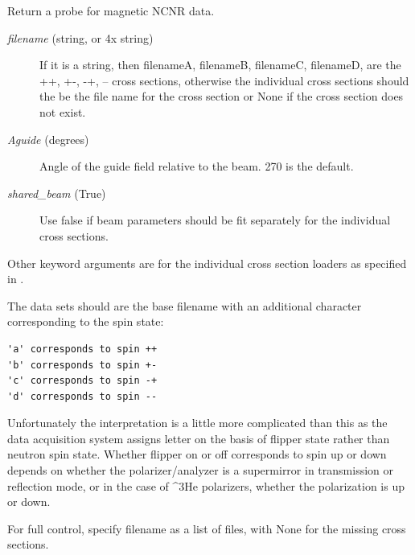 \documentclass[letterpaper,10pt,english]{sphinxmanual}
\begin{document}
\begin{fulllineitems}
\label{api/ncnrdata:refl1d.ncnrdata.load_magnetic}
Return a probe for magnetic NCNR data.
\begin{description}
\item[{\emph{filename} (string, or 4x string)}] \leavevmode
If it is a string, then filenameA, filenameB, filenameC, filenameD,
are the ++, +-, -+, -- cross sections, otherwise the individual
cross sections should the be the file name for the cross section or
None if the cross section does not exist.

\item[{\emph{Aguide} (degrees)}] \leavevmode
Angle of the guide field relative to the beam.  270 is the default.

\item[{\emph{shared\_beam} (True)}] \leavevmode
Use false if beam parameters should be fit separately for the
individual cross sections.

\end{description}

Other keyword arguments are for the individual cross section loaders
as specified in {\hyperref[api/instrument:refl1d.instrument.Monochromatic]{}}.

The data sets should are the base filename with an additional character
corresponding to the spin state:

\begin{Verbatim}[commandchars=@\[\]]
'a' corresponds to spin ++
'b' corresponds to spin +-
'c' corresponds to spin -+
'd' corresponds to spin --
\end{Verbatim}

Unfortunately the interpretation is a little more complicated than
this as the data acquisition system assigns letter on the basis of
flipper state rather than neutron spin state.  Whether flipper on
or off corresponds to spin up or down depends on whether the
polarizer/analyzer is a supermirror in transmission or reflection
mode, or in the case of \textasciicircum{}3He polarizers, whether the polarization
is up or down.

For full control, specify filename as a list of files, with None
for the missing cross sections.

\end{fulllineitems}
\end{document}
